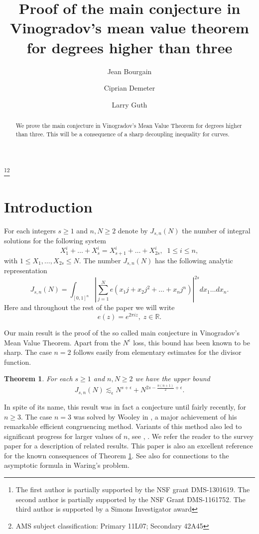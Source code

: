 \documentclass[amssymb,amsfonts,12pt]{amsart}
\newtheorem{theorem}{Theorem}[section]
\def\R{{\mathbb R}}
\begin{document}
\author{Jean Bourgain}
\address{School of Mathematics, Institute for Advanced Study, Princeton NJ}
\author{Ciprian Demeter}
\address{Department of Mathematics, Indiana University,  Bloomington IN}
\author{Larry Guth}
\address{Department of Mathematics, MIT, Cambridge MA}

\thanks{The first author is partially supported by the NSF grant DMS-1301619. The second  author is partially supported  by the NSF Grant DMS-1161752. The third author is supported by a Simons Investigator award}\thanks{ AMS subject classification: Primary 11L07; Secondary 42A45}
\title[Proof of Vinogradov's mean value theorem]{Proof of the main conjecture in Vinogradov's mean value theorem for degrees higher than three}

\begin{abstract}
We prove the main conjecture in Vinogradov's Mean Value Theorem for degrees higher than three. This will be a consequence of a sharp decoupling inequality for curves.
\end{abstract}
\maketitle

\section{Introduction}
For each integers $s\ge 1$ and  $n,N\ge 2$ denote by  $J_{s,n}(N)$ the number of integral solutions for the following system
$$X_1^i+\ldots+X_s^i=X_{s+1}^i+\ldots+X_{2s}^i,\;\;1\le i\le n,$$
with $1\le X_1,\ldots,X_{2s}\le N$.
The number $J_{s,n}(N)$ has the following analytic representation
$$J_{s,n}(N)=\int_{[0,1]^n}|\sum_{j=1}^Ne(x_1j+x_2j^2+\ldots+ x_n j^n)|^{2s}dx_1\ldots dx_n.$$
Here and throughout the rest of the paper we will write  $$e(z)=e^{2\pi i z},\;z\in\R.$$

Our main result  is the proof of the so called main conjecture in Vinogradov's Mean Value Theorem. Apart from the $N^\epsilon$ loss, this bound has been known to be sharp. The case $n=2$  follows easily from elementary estimates for the divisor function.\begin{theorem}
\label{ntmain1}
For each $s\ge 1$ and  $n,N\ge 2$ we have the upper bound
$$J_{s,n}(N)\lesssim_\epsilon N^{s+\epsilon}+N^{2s-\frac{n(n+1)}{2}+\epsilon}.$$
\end{theorem}
  In spite of its name, this result was in fact a conjecture until fairly recently, for $n\ge 3$. The case $n=3$ was solved by Wooley in \cite{Wo}, a major achievement  of his remarkable efficient congruencing method. Variants of this method also led to significant progress for larger values of $n$, see \cite{FoWo}, \cite{Wo1}. We refer the reader to the survey paper \cite{Wo2} for a description of related results. This  paper is also an excellent reference for the known consequences of Theorem \ref{ntmain1}. See also \cite{Wo3} for connections to the asymptotic formula in Waring's problem.
\end{document}

